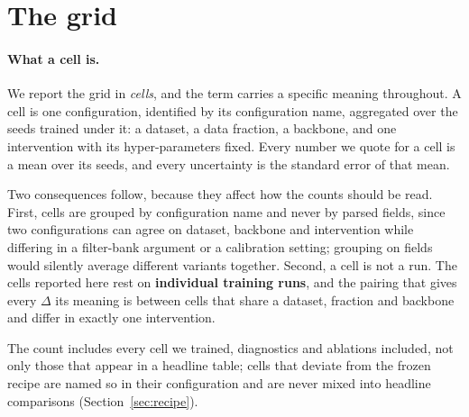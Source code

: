 \section{The grid}\label{sec:grid}

\paragraph{What a cell is.} We report the grid in \emph{cells}, and the
term carries a specific meaning throughout. A cell is one configuration,
identified by its configuration name, aggregated over the seeds trained
under it: a dataset, a data fraction, a backbone, and one intervention with
its hyper-parameters fixed. Every number we quote for a cell is a mean over
its seeds, and every uncertainty is the standard error of that mean.

Two consequences follow, because they affect how the counts
should be read. First, cells are grouped by configuration name and never by
parsed fields, since two configurations can agree on dataset, backbone and
intervention while differing in a filter-bank argument or a calibration
setting; grouping on fields would silently average different variants
together. Second, a cell is not a run. The \computeCells{} cells reported here rest
on \textbf{\computeRuns{} individual training runs}, and the pairing that gives
every $\Delta$ its meaning is between cells that share a dataset, fraction
and backbone and differ in exactly one intervention.

The count includes every cell we trained, diagnostics and ablations
included, not only those that appear in a headline table; cells that deviate
from the frozen recipe are named so in their configuration and are never
mixed into headline comparisons (Section~\ref{sec:recipe}).

